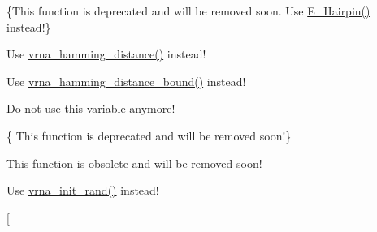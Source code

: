 \begin{DoxyRefList}
\item[\label{deprecated__deprecated000074}%
\hypertarget{deprecated__deprecated000074}{}%
global\+Scope$>$ Global \hyperlink{group__mfe__fold__single_gab327ce11972f5ac069d52c8dedfdb700}{Hairpin\+E} (int size, int type, int si1, int sj1, const char $\ast$string)]\{This function is deprecated and will be removed soon. Use \hyperlink{group__loops_gadf943ee9a45b7f4cee9192c06210dace}{E\+\_\+\+Hairpin()} instead!\}  
\item[\label{deprecated__deprecated000127}%
\hypertarget{deprecated__deprecated000127}{}%
global\+Scope$>$ Global \hyperlink{string__utils_8h_ad9dc7bfc9aa664dc6698f17ce07fc7e7}{hamming} (const char $\ast$s1, const char $\ast$s2)]Use \hyperlink{group__string__utils_ga301798b43b6f66687985c725efd14f32}{vrna\+\_\+hamming\+\_\+distance()} instead!  
\item[\label{deprecated__deprecated000128}%
\hypertarget{deprecated__deprecated000128}{}%
global\+Scope$>$ Global \hyperlink{string__utils_8h_a96d3c36717d624514055ce201cab1542}{hamming\+\_\+bound} (const char $\ast$s1, const char $\ast$s2, int n)]Use \hyperlink{group__string__utils_ga5d1c2271e79d9bcb52d4e68360763fb9}{vrna\+\_\+hamming\+\_\+distance\+\_\+bound()} instead!  
\item[\label{deprecated__deprecated000078}%
\hypertarget{deprecated__deprecated000078}{}%
global\+Scope$>$ Global \hyperlink{fold__vars_8h_a92089ae3a51b5d75a14ce9cc29cc8317}{iindx} ]Do not use this variable anymore!  
\item[\label{deprecated__deprecated000114}%
\hypertarget{deprecated__deprecated000114}{}%
global\+Scope$>$ Global \hyperlink{part__func__co_8h_aa12dda9dd6179cdd22bcce87c0682c07}{init\+\_\+co\+\_\+pf\+\_\+fold} (int length)]\{ This function is deprecated and will be removed soon!\}  
\item[\label{deprecated__deprecated000103}%
\hypertarget{deprecated__deprecated000103}{}%
global\+Scope$>$ Global \hyperlink{part__func_8h_a15176e23eceeff8c7d14eabcfec8a2af}{init\+\_\+pf\+\_\+fold} (int length)]This function is obsolete and will be removed soon!  
\item[\label{deprecated__deprecated000152}%
\hypertarget{deprecated__deprecated000152}{}%
global\+Scope$>$ Global \hyperlink{utils_8h_a8aaa6d9be6f803f496d9b97375c371f3}{init\+\_\+rand} (void)]Use \hyperlink{group__utils_ga0ad1f40ea316e5c5918695c35613027a}{vrna\+\_\+init\+\_\+rand()} instead!  
\item[\label{deprecated__deprecated000038}%
\hypertarget{deprecated__deprecated000038}{}%

\end{DoxyRefList}
